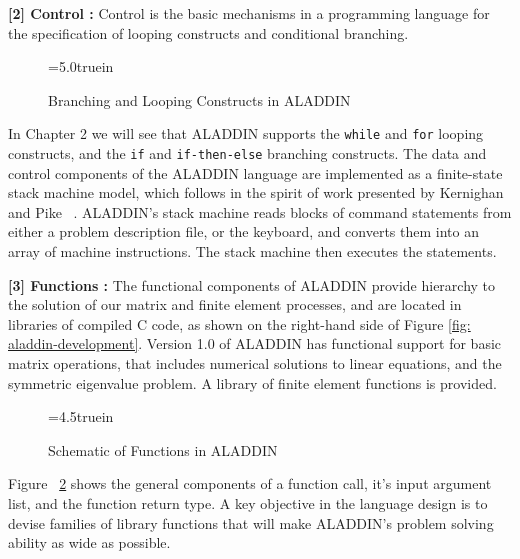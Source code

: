 \vspace{0.15 in}\noindent
{\bf [2] Control :} Control is the basic mechanisms in a programming
language for the specification of looping constructs and conditional branching.

\begin{figure}[ht]
\vspace{0.15 in}
\epsfxsize=5.0truein
\centerline{}
\caption{Branching and Looping Constructs in ALADDIN}
\label{fig: aladdin-branch-and-loop}
\end{figure}

\vspace{0.15 in}\noindent
In Chapter 2 we will see that ALADDIN supports the
{\tt while} and {\tt for} looping constructs,
and the {\tt if} and {\tt if-then-else} branching constructs.
The data and control components of the ALADDIN language are
implemented as a finite-state stack machine model, which follows in the
spirit of work presented by Kernighan and Pike ~\cite{kernighan-pike}.
ALADDIN's stack machine reads blocks of command statements from either a problem
description file, or the keyboard,
and converts them into an array of machine instructions.
The stack machine then executes the statements.

\vspace{0.15 in}\noindent
{\bf [3] Functions :} 
The functional components of ALADDIN provide hierarchy to the
solution of our matrix and finite element processes,
and are located in libraries of compiled C code,
as shown on the right-hand side of Figure \ref{fig: aladdin-development}.
Version 1.0 of ALADDIN has functional support for basic matrix operations,
that includes numerical solutions to linear equations, 
and the symmetric eigenvalue problem.
A library of finite element functions is provided.

\begin{figure}[ht]
\vspace{0.10 in}
\epsfxsize=4.5truein
\centerline{}
\caption{Schematic of Functions in ALADDIN}
\label{fig: aladdin-functions}
\end{figure}

\vspace{0.15 in}\noindent
Figure ~\ref{fig: aladdin-functions} shows the general
components of a function call, it's input argument list,
and the function return type.
A key objective in the language design is to devise families of
library functions that will make ALADDIN's problem
solving ability as wide as possible.

